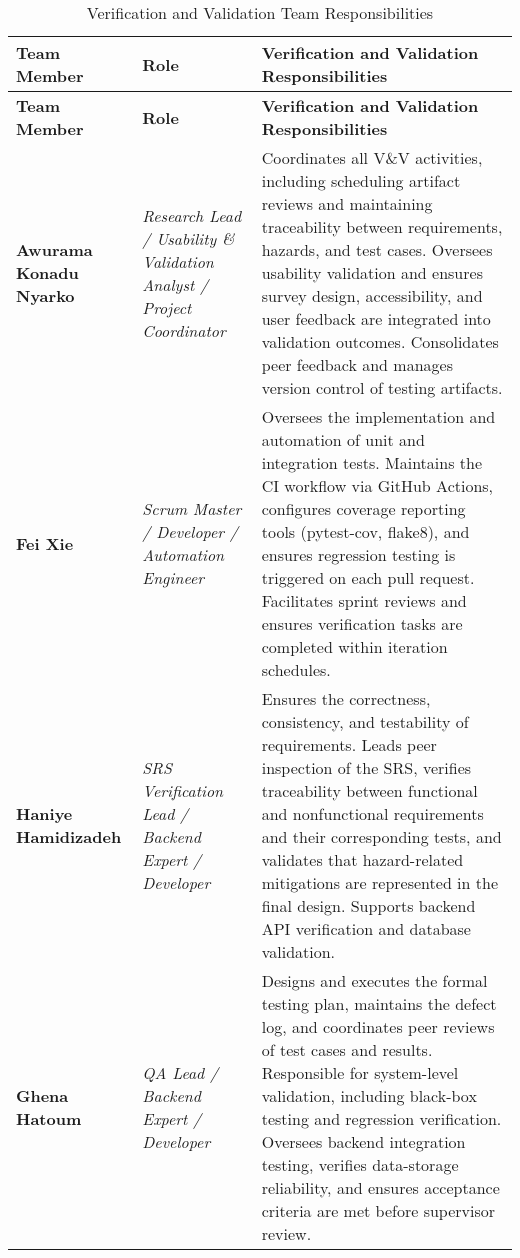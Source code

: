 \documentclass[12pt, titlepage]{article}
\begin{document}
\begin{center}
\footnotesize 
{}
\begin{longtable}{|>{\raggedright\arraybackslash}p{}|
                    >{\raggedright\arraybackslash}p{}|
                    >{\raggedright\arraybackslash}p{}|}
\caption{Verification and Validation Team Responsibilities} \\
\hline
\rowcolor{gray!15}
\textbf{Team Member} & \textbf{Role} & \textbf{Verification and Validation Responsibilities} \\
\hline
\endfirsthead

\hline
\rowcolor{gray!15}
\textbf{Team Member} & \textbf{Role} & \textbf{Verification and Validation Responsibilities} \\
\hline
\endhead

\hline
\endfoot
\hline
\endlastfoot

\textbf{Awurama Konadu Nyarko} &
\textit{Research Lead / Usability \& Validation Analyst / Project Coordinator} &
Coordinates all V\&V activities, including scheduling artifact reviews and maintaining traceability between requirements, hazards, and test cases. Oversees usability validation and ensures survey design, accessibility, and user feedback are integrated into validation outcomes. Consolidates peer feedback and manages version control of testing artifacts. \\
\hline

\textbf{Fei Xie} &
\textit{Scrum Master / Developer / Automation Engineer} &
Oversees the implementation and automation of unit and integration tests. Maintains the CI workflow via GitHub Actions, configures coverage reporting tools (pytest-cov, flake8), and ensures regression testing is triggered on each pull request. Facilitates sprint reviews and ensures verification tasks are completed within iteration schedules. \\
\hline

\textbf{Haniye Hamidizadeh} &
\textit{SRS Verification Lead / Backend Expert / Developer} &
Ensures the correctness, consistency, and testability of requirements. Leads peer inspection of the SRS, verifies traceability between functional and nonfunctional requirements and their corresponding tests, and validates that hazard-related mitigations are represented in the final design. Supports backend API verification and database validation. \\
\hline

\textbf{Ghena Hatoum} &
\textit{QA Lead / Backend Expert / Developer} &
Designs and executes the formal testing plan, maintains the defect log, and coordinates peer reviews of test cases and results. Responsible for system-level validation, including black-box testing and regression verification. Oversees backend integration testing, verifies data-storage reliability, and ensures acceptance criteria are met before supervisor review. \\
\hline


\end{longtable}
\end{center}
\end{document}

